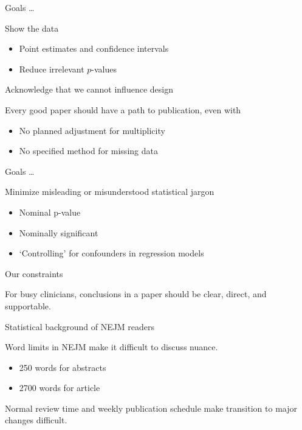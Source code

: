 \documentclass[ignorenonframetext,]{beamer}
\begin{document}
\begin{frame}{Goals \ldots}
\protect\hypertarget{goals}{}

Show the data

\begin{itemize}
\item
  Point estimates and confidence intervals
\item
  Reduce irrelevant \(p\)-values
\end{itemize}

Acknowledge that we cannot influence design

Every good paper should have a path to publication, even with

\begin{itemize}
\item
  No planned adjustment for multiplicity
\item
  No specified method for missing data
\end{itemize}

\end{frame}

\begin{frame}{Goals \ldots}
\protect\hypertarget{goals-1}{}

Minimize misleading or misunderstood statistical jargon

\begin{itemize}
\item
  Nominal p-value
\item
  Nominally significant
\item
  `Controlling' for confounders in regression models
\end{itemize}

\end{frame}

\begin{frame}{Our constraints}
\protect\hypertarget{our-constraints}{}

For busy clinicians, conclusions in a paper should be clear, direct, and
supportable.

Statistical background of NEJM readers

Word limits in NEJM make it difficult to discuss nuance.

\begin{itemize}
\item
  250 words for abstracts
\item
  2700 words for article
\end{itemize}

Normal review time and weekly publication schedule make transition to
major changes difficult.

\end{frame}
\end{document}
